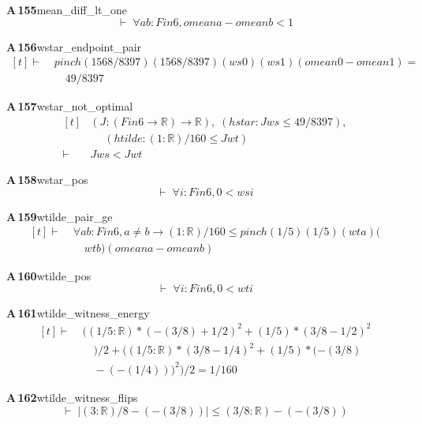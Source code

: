 \documentclass[conference]{IEEEtran}
\theoremstyle{definition}
\newcommand{\lean}[1]{\textsf{\footnotesize #1}}
\begin{document}
\noindent\textbf{A\,155}\quad\lean{mean\_diff\_lt\_one}
{\footnotesize\[ \vdash\; \forall \mathit{a} \mathit{b} : \mathit{Fin} 6, \mathit{omean} \mathit{a} - \mathit{omean} \mathit{b} < 1 \]}

\noindent\textbf{A\,156}\quad\lean{wstar\_endpoint\_pair}
{\footnotesize\[ \begin{aligned}[t]
\vdash\;&\mathit{pinch} (1568/8397) (1568/8397) (\mathit{ws} 0) (\mathit{ws} 1) (\mathit{omean} 0 - \mathit{omean} 1) =\\
&\quad 49/8397
\end{aligned} \]}

\noindent\textbf{A\,157}\quad\lean{wstar\_not\_optimal}
{\footnotesize\[ \begin{aligned}[t]
&(\mathit{J} : (\mathit{Fin} 6 \to \mathbb{R} ) \to \mathbb{R} ),\; (\mathit{hstar} : \mathit{J} \mathit{ws} \leq 49/8397),\\
&\quad \; (\mathit{htilde} : (1:\mathbb{R} )/160 \leq \mathit{J} \mathit{wt})\\
\vdash\;&\mathit{J} \mathit{ws} < \mathit{J} \mathit{wt}
\end{aligned} \]}

\noindent\textbf{A\,158}\quad\lean{wstar\_pos}
{\footnotesize\[ \vdash\; \forall \mathit{i} : \mathit{Fin} 6, 0 < \mathit{ws} \mathit{i} \]}

\noindent\textbf{A\,159}\quad\lean{wtilde\_pair\_ge}
{\footnotesize\[ \begin{aligned}[t]
\vdash\;&\forall \mathit{a} \mathit{b} : \mathit{Fin} 6, \mathit{a} \neq \mathit{b} \to (1:\mathbb{R} )/160 \leq \mathit{pinch} (1/5) (1/5) (\mathit{wt} \mathit{a}) (\\
&\quad \mathit{wt} \mathit{b}) (\mathit{omean} \mathit{a} - \mathit{omean} \mathit{b})
\end{aligned} \]}

\noindent\textbf{A\,160}\quad\lean{wtilde\_pos}
{\footnotesize\[ \vdash\; \forall \mathit{i} : \mathit{Fin} 6, 0 < \mathit{wt} \mathit{i} \]}

\noindent\textbf{A\,161}\quad\lean{wtilde\_witness\_energy}
{\footnotesize\[ \begin{aligned}[t]
\vdash\;&((1/5 : \mathbb{R} ) * (-(3/8) + 1/2) ^{2} + (1/5) * (3/8 - 1/2) ^{2}\\
&\quad ) / 2 + ((1/5 : \mathbb{R} ) * (3/8 - 1/4) ^{2} + (1/5) * (-(3/8)\\
&\quad - (-(1/4))) ^{2}) / 2 = 1/160
\end{aligned} \]}

\noindent\textbf{A\,162}\quad\lean{wtilde\_witness\_flips}
{\footnotesize\[ \vdash\; |(3:\mathbb{R} )/8 - (-(3/8))| \leq (3/8 : \mathbb{R} ) - (-(3/8)) \]}
\end{document}

